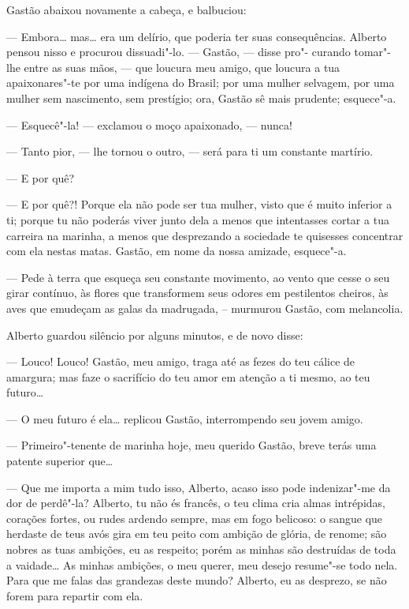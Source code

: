 Gastão abaixou novamente a cabeça, e balbuciou:

--- Embora\ldots{} mas\ldots{} era um delírio, que poderia ter suas consequências.
Alberto pensou nisso e procurou dissuadi"-lo. --- Gastão, --- disse pro"-
curando tomar"-lhe entre as suas mãos, --- que loucura meu amigo, que
loucura a tua apaixonares"-te por uma indígena do Brasil; por uma mulher
selvagem, por uma mulher sem nascimento, sem prestígio; ora, Gastão sê
mais prudente; esquece"-a.

--- Esquecê"-la! --- exclamou o moço apaixonado, --- nunca!

--- Tanto pior, --- lhe tornou o outro, --- será para ti um constante
martírio.

--- E por quê?

--- E por quê?! Porque ela não pode ser tua mulher, visto que é muito
inferior a ti; porque tu não poderás viver junto dela a menos que
intentasses cortar a tua carreira na marinha, a menos que desprezando a
sociedade te quisesses concentrar com ela nestas matas. Gastão, em nome
da nossa amizade, esquece"-a.

--- Pede à terra que esqueça seu constante movimento, ao vento que cesse
o seu girar contínuo, às flores que transformem seus odores em
pestilentos cheiros, às aves que emudeçam as galas da madrugada, --
murmurou Gastão, com melancolia.

Alberto guardou silêncio por alguns minutos, e de novo disse:

--- Louco! Louco! Gastão, meu amigo, traga até as fezes do teu cálice de
amargura; mas faze o sacrifício do teu amor em atenção a ti mesmo, ao
teu futuro\ldots{}

--- O meu futuro é ela\ldots{} replicou Gastão, interrompendo seu jovem
amigo.

--- Primeiro"-tenente de marinha hoje, meu querido Gastão, breve terás
uma patente superior que\ldots{}

--- Que me importa a mim tudo isso, Alberto, acaso isso pode
indenizar"-me da dor de perdê"-la? Alberto, tu não és francês, o teu clima
cria almas intrépidas, corações fortes, ou rudes ardendo sempre, mas em
fogo belicoso: o sangue que herdaste de teus avós gira em teu peito com
ambição de glória, de renome; são nobres as tuas ambições, eu as
respeito; porém as minhas são destruídas de toda a vaidade\ldots{} As minhas
ambições, o meu querer, meu desejo resume"-se todo nela. Para que me
falas das grandezas deste mundo? Alberto, eu as desprezo, se não forem
para repartir com ela.

